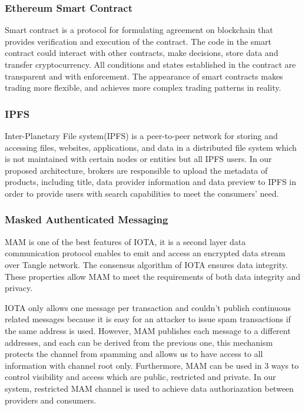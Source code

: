 \documentclass[journal,a4paper]{IEEEtran}
\begin{document}
\subsubsection{Ethereum Smart Contract}
Smart contract\cite{smartContract} is a protocol for formulating agreement on blockchain that provides verification and execution of the contract. The code in the smart contract could interact with other contracts, make decisions, store data and transfer cryptocurrency. All conditions and states established in the contract are transparent and with enforcement. The appearance of smart contracts makes trading more flexible, and achieves more complex trading patterns in reality.

\subsubsection{IPFS}
Inter-Planetary File system(IPFS)\cite{IPFS} is a peer-to-peer network for storing and accessing files, websites, applications, and data in a distributed file system which is not maintained with certain nodes or entities but all IPFS users. In our proposed architecture, brokers are responsible to upload the metadata of products, including title, data provider information and data preview to IPFS in order to provide users with search capabilities to meet the consumers' need.

\subsubsection{Masked Authenticated Messaging}
MAM\cite{MAM} is one of the best features of IOTA, it is a second layer data communication protocol enables to emit and access an encrypted data stream over Tangle network. The consensus algorithm of IOTA ensures data integrity. These properties allow MAM to meet the requirements of both data integrity and privacy.

IOTA only allows one message per transaction and couldn't publish continuous related messages because it is easy for an attacker to issue spam transactions if the same address is used. However, MAM publishes each message to a different addresses, and each can be derived from the previous one, this mechanism protects the channel from spamming and allows us to have access to all information with channel root only. Furthermore, MAM can be used in 3 ways to control visibility and access which are public, restricted and private. In our system, restricted MAM channel is used to achieve data authoriazation between providers and consumers.
\end{document}
